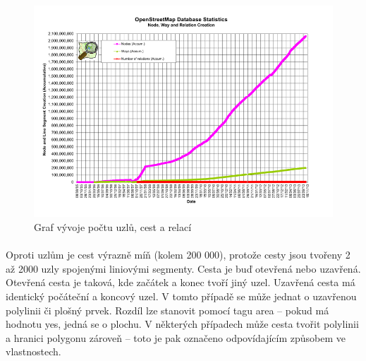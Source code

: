 \documentclass[11pt,a4paper,titlepage,oneside]{book}
\begin{document}
		\begin{figure}[!h]
			\begin{center}
				\includegraphics[width=12cm]{obrazky/osm_stat_elements.png}
				\caption{Graf vývoje počtu uzlů, cest a relací}
			\end{center}
		\end{figure}


		\paragraph{} Oproti uzlům je cest výrazně míň (kolem 200 000), protože cesty jsou tvořeny 2 až 2000 uzly spojenými liniovými segmenty. Cesta je buď otevřená nebo uzavřená. Otevřená cesta je taková, kde začátek a konec tvoří jiný uzel. Uzavřená cesta má identický počáteční a koncový uzel. V tomto případě se může jednat o uzavřenou polylinii či plošný prvek. Rozdíl lze stanovit pomocí tagu area -- pokud má hodnotu yes, jedná se o plochu. V některých případech může cesta tvořit polylinii a hranici polygonu zároveň -- toto je pak označeno odpovídajícím způsobem ve vlastnostech.
\end{document}
